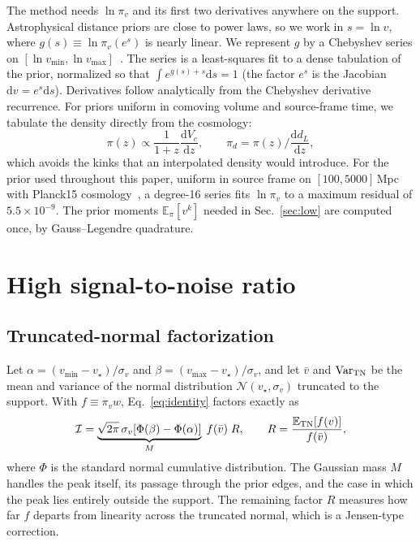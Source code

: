\documentclass[prd,twocolumn,nofootinbib,superscriptaddress,amsmath,amssymb]{revtex4-2}
\newcommand{\dd}{\mathrm{d}}
\newcommand{\vs}{v_\star}
\newcommand{\vmin}{v_{\min}}
\newcommand{\vmax}{v_{\max}}
\newcommand{\E}{\mathbb{E}}
\newcommand{\Var}{\mathrm{Var}}
\begin{document}
The method needs $\ln\pi_v$ and its first two derivatives anywhere on the support.
Astrophysical distance priors are close to power laws,
so we work in $s=\ln v$,
where $g(s)\equiv\ln\pi_v(e^s)$ is nearly linear.
We represent $g$ by a Chebyshev series on $[\ln\vmin,\ln\vmax]$~\cite{Trefethen2013}.
The series is a least-squares fit to a dense tabulation of the prior,
normalized so that $\int e^{g(s)+s}\dd s = 1$ (the factor $e^s$ is the Jacobian $\dd v=e^s\dd s$).
Derivatives follow analytically from the Chebyshev derivative recurrence.
For priors uniform in comoving volume and source-frame time,
we tabulate the density directly from the cosmology:
\begin{equation}
\pi(z)\propto\frac{1}{1+z}\frac{\dd V_c}{\dd z},\qquad
\pi_d = \pi(z)\Big/\frac{\dd d_L}{\dd z},
\end{equation}
which avoids the kinks that an interpolated density would introduce.
For the prior used throughout this paper,
uniform in source frame on $[100,5000]$\,Mpc with Planck15 cosmology~\cite{Planck2016},
a degree-16 series fits $\ln\pi_v$ to a maximum residual of $5.5\times10^{-9}$.
The prior moments $\E_\pi[v^k]$ needed in Sec.~\ref{sec:low} are computed once,
by Gauss--Legendre quadrature.

\section{High signal-to-noise ratio}
\label{sec:high}

\subsection{Truncated-normal factorization}

Let $\alpha=(\vmin-\vs)/\sigma_v$ and $\beta=(\vmax-\vs)/\sigma_v$,
and let $\bar v$ and $\Var_{\rm TN}$ be the mean and variance of the normal distribution $\mathcal{N}(\vs,\sigma_v)$ truncated to the support.
With $f\equiv\pi_v w$,
Eq.~\eqref{eq:identity} factors exactly as
\begin{equation}
\mathcal{I} = \underbrace{\sqrt{2\pi}\,\sigma_v[\Phi(\beta)-\Phi(\alpha)]}_{M}\;f(\bar v)\;R,
\qquad R = \frac{\E_{\rm TN}[f(v)]}{f(\bar v)},
\label{eq:factor}
\end{equation}
where $\Phi$ is the standard normal cumulative distribution.
The Gaussian mass $M$ handles the peak itself,
its passage through the prior edges,
and the case in which the peak lies entirely outside the support.
The remaining factor $R$ measures how far $f$ departs from linearity across the truncated normal,
which is a Jensen-type correction.
\end{document}
